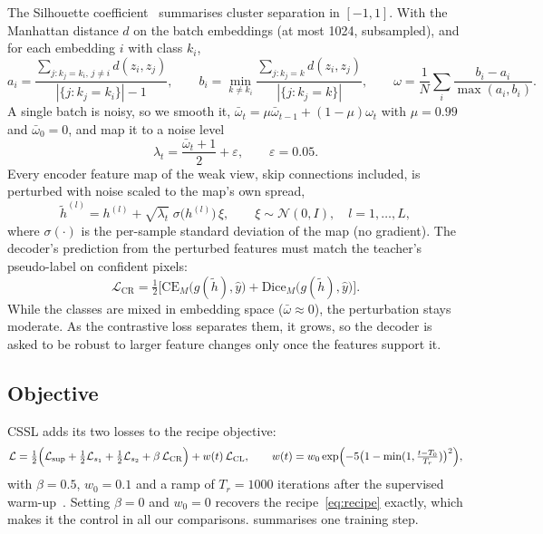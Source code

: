 \documentclass[11pt]{article}
\newcommand{\Lsup}{\mathcal{L}_{\mathrm{sup}}}
\newcommand{\Lcr}{\mathcal{L}_{\mathrm{CR}}}
\newcommand{\Lcl}{\mathcal{L}_{\mathrm{CL}}}
\newcommand{\CE}{\mathrm{CE}}
\newcommand{\Dice}{\mathrm{Dice}}
\begin{document}
The Silhouette coefficient~\citep{rousseeuw1987silhouettes} summarises cluster separation in $[-1,1]$. With the Manhattan distance $d$ on the batch embeddings (at most 1024, subsampled), and for each embedding $i$ with class $k_i$,
\begin{equation}
  a_i=\frac{\sum_{j:k_j=k_i,\,j\ne i}d(z_i,z_j)}{|\{j:k_j=k_i\}|-1},\qquad
  b_i=\min_{k\neq k_i}\frac{\sum_{j:k_j=k}d(z_i,z_j)}{|\{j:k_j=k\}|},\qquad
  \omega=\frac1N\sum_i\frac{b_i-a_i}{\max(a_i,b_i)}.
  \label{eq:sil}
\end{equation}
A single batch is noisy, so we smooth it, $\bar\omega_t=\mu\bar\omega_{t-1}+(1-\mu)\omega_t$ with $\mu=0.99$ and $\bar\omega_0=0$, and map it to a noise level
\begin{equation}
  \lambda_t=\frac{\bar\omega_t+1}{2}+\varepsilon,\qquad \varepsilon=0.05.
  \label{eq:lambda}
\end{equation}
Every encoder feature map of the weak view, skip connections included, is perturbed with noise scaled to the map's own spread,
\begin{equation}
  \tilde h^{(l)}=h^{(l)}+\sqrt{\lambda_t}\;\sigma\bigl(h^{(l)}\bigr)\,\xi,\qquad \xi\sim\mathcal{N}(0,I),\quad l=1,\dots,L,
  \label{eq:noise}
\end{equation}
where $\sigma(\cdot)$ is the per-sample standard deviation of the map (no gradient). The decoder's prediction from the perturbed features must match the teacher's pseudo-label on confident pixels:
\begin{equation}
  \Lcr=\tfrac12\bigl[\CE_M\bigl(g(\tilde h),\hat y\bigr)+\Dice_M\bigl(g(\tilde h),\hat y\bigr)\bigr].
  \label{eq:cr}
\end{equation}
While the classes are mixed in embedding space ($\bar\omega\approx0$), the perturbation stays moderate. As the contrastive loss separates them, it grows, so the decoder is asked to be robust to larger feature changes only once the features support it.

\subsection{Objective}
\label{sec:objective}

CSSL adds its two losses to the recipe objective:
\begin{equation}
  \mathcal{L}=\tfrac12\Bigl(\Lsup+\tfrac12\mathcal{L}_{s_1}+\tfrac12\mathcal{L}_{s_2}+\beta\,\Lcr\Bigr)+w(t)\,\Lcl,\qquad
  w(t)=w_0\exp\Bigl(-5\bigl(1-\min(1,\tfrac{t-T_0}{T_r})\bigr)^2\Bigr),
  \label{eq:total}
\end{equation}
with $\beta=0.5$, $w_0=0.1$ and a ramp of $T_r=1000$ iterations after the supervised warm-up~\citep{laine2017temporal}. Setting $\beta=0$ and $w_0=0$ recovers the recipe~\eqref{eq:recipe} exactly, which makes it the control in all our comparisons.  summarises one training step.
\end{document}
